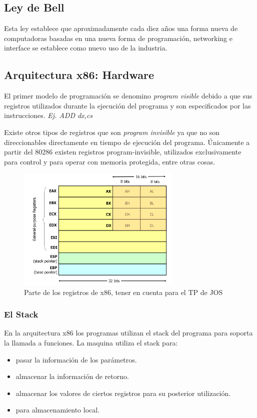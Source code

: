 \documentclass[titlepage,a4paper]{article}
\begin{document}
\subsection*{Ley de Bell}
Esta ley establece que aproximadamente cada diez años una forma nueva de computadoras basadas en una nueva forma de programación, networking e interface se establece como nuevo uso de la industria.


\subsection*{Arquitectura x86: Hardware}
El primer modelo de programación se denomino \textit{program visible} debido a que sus registros utilizados durante la ejecución del programa y son especificados por las instrucciones. \textit{Ej. ADD dx,cs}

Existe otros tipos de registros que son \textit{program invisible} ya que no son direccionables directamente en tiempo de ejecución del programa. Únicamente a partir del 80286 existen registros program-invisible, utilizados exclusivamente para control y para operar con memoria protegida, entre otras cosas.

\begin{figure}[!htb]
    \centering
    \includegraphics[width=0.7\textwidth]{ImagenesApunte/registrosX86.png}
    \caption{Parte de los registros de x86, tener en cuenta para el TP de JOS}
\end{figure}

\subsubsection*{El Stack}

En la arquitectura x86 los programas utilizan el stack del programa para soporta la llamada a funciones. La maquina utiliza el stack para:
\begin{itemize}
    \item pasar la información de los parámetros.
    \item almacenar la información de retorno.
    \item almacenar los valores de ciertos registros para su posterior utilización.
    \item para almacenamiento local.
\end{itemize}
\end{document}
